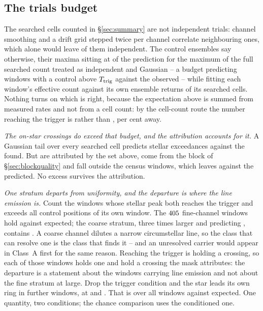 \subsection{The trials budget}

The searched cells counted in \S\ref{sec:summary} are not independent
trials: channel smoothing and a drift grid stepped twice per channel
correlate neighbouring ones, which alone would leave \StGridFrac{} of them
independent. The control ensembles say otherwise, their maxima sitting at
\CtrlMaxRatioMed{} of the prediction for the maximum of the full searched
count treated as independent and Gaussian -- a budget predicting
\NCtrlWinExp{} windows with a control above $T_{\rm trig}$ against the
\NCtrlWinObs{} observed -- while fitting each window's effective count
against its own ensemble returns \StNindFrac{} of its searched cells. Nothing
turns on which is right, because the expectation above is summed from measured
rates and not from a cell count: by the cell-count route the number reaching
the trigger is \StExpModel{} rather than \CeExpTrig, \StModelAgreePct{} per
cent away.

\emph{The on-star crossings do exceed that budget, and the attribution
accounts for it.} A Gaussian tail over every searched cell predicts
\CellExpect{} stellar exceedances against the \NCross{} found. But \MkAttr{}
are attributed by the set above, \EvNCrossFlag{} come from the block of
\S\ref{sec:blockquality} and \CeNTailCross{} fall outside the census windows,
which leaves \CeObs{} against the \CeExpSurv{} predicted. No excess survives
the
attribution.

\emph{One stratum departs from uniformity, and the departure is where the
line emission is.} Count the windows whose stellar peak both reaches the
trigger and exceeds all \NCtrl{} control positions of its own window. The
$405$ fine-channel windows hold \NStageOneFine{} against
\ExpStageOneFine{} expected; the coarse stratum, three times larger and
predicting \ExpStageOneCoarse, contains \NStageOneCoarse. A coarse
channel dilutes a narrow circumstellar line, so the class that can resolve
one is the class that finds it -- and an unresolved carrier would appear in
Class~A first for the same reason. Reaching the trigger is holding a
crossing, so each of those windows holds one and \CeFirstAttr{} hold a
crossing the mask attributes: the departure is a statement about the windows
carrying line emission and not about the fine stratum at large. Drop the
trigger condition and the star leads its own ring in \BkFirstBelow{} further
windows, at \BkFirstBelowTLo{} and \BkFirstBelowTHi. That is \NsrFirstObs{}
over all \NWindows{} windows against \NsrFirstExp{} expected. One quantity,
two conditions; the chance comparison uses the conditioned one.

